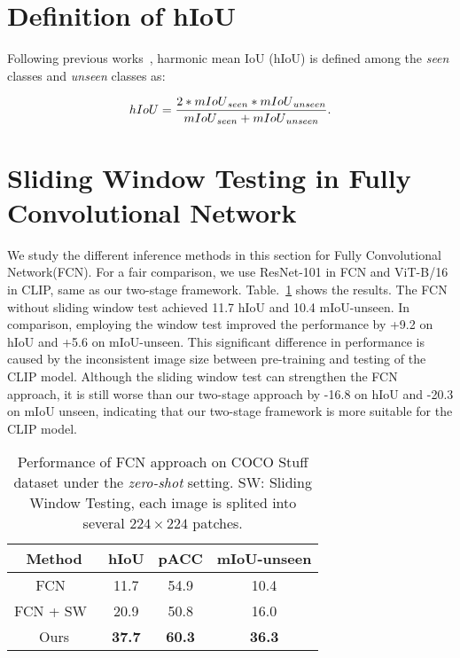 \documentclass[runningheads]{llncs}
\begin{document}
\section{Definition of hIoU}
Following previous works~\cite{xian2019semantic,pastore2021closer}, harmonic mean IoU (hIoU) is defined among the \emph{seen} classes and \emph{unseen} classes as:

\begin{equation}
\small
     hIoU=\frac{2*{mIoU}_{seen}*{mIoU}_{unseen}}{{mIoU}_{seen}+{mIoU}_{unseen}}.
\end{equation}


\section{Sliding Window Testing in Fully Convolutional Network}
We study the different inference methods in this section for Fully Convolutional Network(FCN). For a fair comparison, we use ResNet-101 in FCN and ViT-B/16 in CLIP, same as our two-stage framework. Table.~\ref{tab:fcn} shows the results. The FCN without sliding window test achieved 11.7 hIoU and 10.4 mIoU-unseen. In comparison, employing the window test improved the performance by +9.2 on hIoU and +5.6 on mIoU-unseen. This significant difference in performance is caused by the inconsistent image size between pre-training and testing of the CLIP model. Although the sliding window test can strengthen the FCN approach, it is still worse than our two-stage approach by -16.8 on hIoU and -20.3 on mIoU unseen, indicating that our two-stage framework is more suitable for the CLIP model.

\begin{table}[]
    \footnotesize
    \centering
    \caption{Performance of FCN approach on COCO Stuff dataset under the \emph{zero-shot} setting. SW: Sliding Window Testing, each image is splited into several $224\times 224$ patches.}
    \begin{tabular}{c|c|c|c}
    \toprule
    Method & hIoU & pACC & mIoU-unseen\\
  \hline
    FCN~\cite{long2015fully} &11.7& 54.9 & 10.4\\
    FCN + SW~\cite{long2015fully} &20.9 & 50.8 &16.0  \\
    \hline
    Ours & \textbf{37.7}&\textbf{60.3}&\textbf{36.3}\\
    \bottomrule
    \end{tabular}
    \label{tab:fcn}
    \vspace{-2em}
\end{table}
\end{document}
